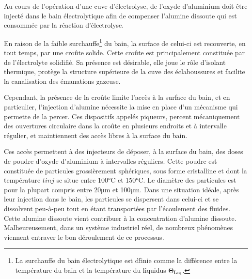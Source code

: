 
Au cours de l'opération d'une cuve d'électrolyse, de l'oxyde
d'aluminium doit être injecté dans le bain électrolytique afin
de compenser l'alumine dissoute qui est consommée par la
réaction d'électrolyse.

En raison de la faible surchauffe\footnote{La surchauffe du bain
  électrolytique est d\'finie comme la différence entre la température
  du bain et la température du liquidus $\Theta_\text{Liq}$.} du bain, la surface
de celui-ci est recouverte, en tout temps, par une croûte
solide. Cette croûte est principalement constituée par de
l'électrolyte solidifié. Sa présence est
désirable, elle joue le rôle d'isolant thermique, protège la structure
supérieure de la cuve des éclaboussures et facilite la canalisation
des émanations gazeuse.

Cependant, la présence de la croûte limite l'accès à la surface du
bain, et en particulier, l'injection d'alumine nécessite la mise en
place d'un mécanisme qui permette de la percer. Ces dispositifs
appelés piqueurs, percent mécaniquement des ouvertures circulaire dans
la croûte en plusieurs endroits et à intervalle régulier, et
maintiennent des accès libres à la surface du bain.

Ces accès permettent à des injecteurs de déposer, à la surface du
bain, des doses de poudre d'oxyde d'aluminium à intervalles
réguliers. Cette poudre est constituée de particules grossièrement
sphériques, sous forme cristalline et dont la température $tinj$ se
situe entre \num{100}\si{\celsius} et \num{150}\si{\celsius}. Le
diamètre des particules est pour la plupart compris entre
\num{20}\si{\micro\meter} et \num{100}\si{\micro\meter}.
Dans une situation idéale, après leur injection dans le bain, les
particules se dispersent dans celui-ci et se dissolvent peu-à-peu tout
en étant transportées par l'écoulement des fluides. Cette alumine
dissoute vient contribuer à la concentration d'alumine
dissoute. Malheureusement, dans un système industriel réel, de
nombreux phénomènes viennent entraver le bon déroulement de ce processus.


